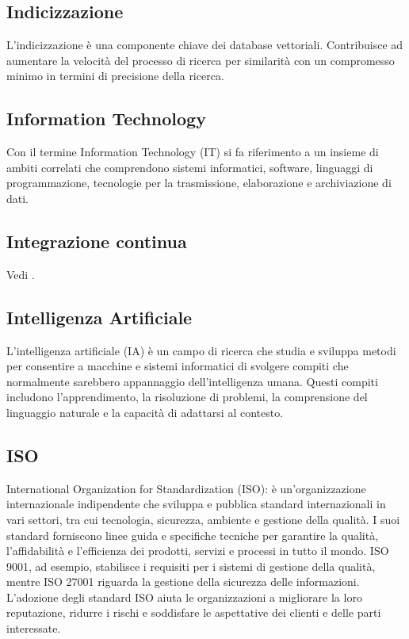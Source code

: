 \vspace{2em}
\subsection*{Indicizzazione}
L'indicizzazione è una componente chiave dei database vettoriali. Contribuisce ad aumentare la velocità del processo di ricerca per similarità con un compromesso minimo in termini di precisione della ricerca.

\vspace{2em}
\subsection*{Information Technology}
\par Con il termine Information Technology (IT) si fa riferimento a un insieme di ambiti correlati che comprendono sistemi informatici, software, linguaggi di programmazione, tecnologie per la trasmissione, elaborazione e archiviazione di dati.

\vspace{2em}
\subsection*{Integrazione continua}
\par Vedi .

\vspace{2em}
\subsection*{Intelligenza Artificiale}
\par L'intelligenza artificiale (IA) è un campo di ricerca che studia e sviluppa metodi per consentire a macchine e sistemi informatici di svolgere compiti che normalmente sarebbero appannaggio dell'intelligenza umana. Questi compiti includono l'apprendimento, la risoluzione di problemi, la comprensione del linguaggio naturale e la capacità di adattarsi al contesto.

\vspace{2em}
\subsection*{ISO}
\par International Organization for Standardization (ISO): è un'organizzazione internazionale indipendente che sviluppa e pubblica standard internazionali in vari settori, tra cui tecnologia, sicurezza, ambiente e gestione della qualità. I suoi standard forniscono linee guida e specifiche tecniche per garantire la qualità, l'affidabilità e l'efficienza dei prodotti, servizi e processi in tutto il mondo. ISO 9001, ad esempio, stabilisce i requisiti per i sistemi di gestione della qualità, mentre ISO 27001 riguarda la gestione della sicurezza delle informazioni. L'adozione degli standard ISO aiuta le organizzazioni a migliorare la loro reputazione, ridurre i rischi e soddisfare le aspettative dei clienti e delle parti interessate.

